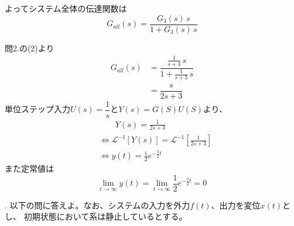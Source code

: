 \documentclass[a4paper,12pt]{article}
\begin{document}
\begin{tcolorbox}
\begin{center}

\end{center}

よってシステム全体の伝達関数は\\
\[
G_{all}(s)=\dfrac{G_3(s)\,s}{1 + G_3(s)\,s}
\]


\end{tcolorbox}


\begin{tcolorbox}[title={3. 問2.の(2)のシステムについて、\(G_3(s)=\dfrac{1}{s+3}\)のとき、単位ステップ入力を印加した際の応答を求めよ。
また、定常状態における値が存在すれば、その値を求めよ。}]

問2.の(2)より
\begin{align*}
G_{all}(s) &=  \dfrac{\frac{1}{s+3}\,s}{1 + \frac{1}{s+3}\,s} \\
            &= \dfrac{s}{2s+3}
\end{align*}
単位ステップ入力\(U(s)=\dfrac{1}{s}\)と\(Y(s)=G(S)U(S)\)より、
\begin{align*}
    &\qquad Y(s) =\frac{1}{2s+3} \\
    &\Leftrightarrow \mathcal{L}^{-1} \left[ Y(s) \right]
    =\mathcal{L}^{-1} \left[ \frac{1}{2s+3} \right]\\
    &\Leftrightarrow y(t) =  \frac{1}{2}e^{-\frac{3}{2}t}
\end{align*}
また定常値は
\[
\lim_{t \to \infty} y(t) = \lim_{t \to \infty} \frac{1}{2} e^{-\frac{3}{2}t} = 0
\]
\end{tcolorbox}

\newpage


. 以下の問に答えよ。なお、システムの入力を外力\(f(t)\)、出力を変位\(x(t)\)とし、
初期状態において系は静止しているとする。
\end{document}
